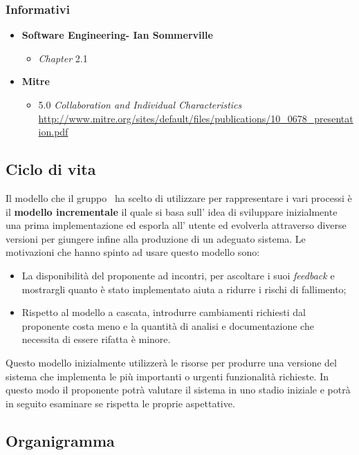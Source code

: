 \subsubsection{Informativi}
\begin{itemize}
\item \textbf{Software Engineering- Ian Sommerville}
	\begin{itemize}
	\item \textit{Chapter} 2.1
	\end{itemize}
\item \textbf{Mitre}
	\begin{itemize} 
	\item 5.0 \textit{Collaboration and Individual Characteristics} \url{http://www.mitre.org/sites/default/files/publications/10_0678_presentation.pdf}
	\end{itemize}
\end{itemize}
\subsection{Ciclo di vita}
\label{subsec:ciclodivita}
Il modello che il gruppo \gruppo ~ha scelto di utilizzare per rappresentare i vari processi è il \textbf{modello incrementale} il quale si basa sull' idea di sviluppare inizialmente una prima implementazione ed esporla all' utente ed evolverla attraverso diverse versioni per giungere infine alla produzione di un adeguato sistema. Le motivazioni che hanno spinto ad usare questo modello sono:
\begin{itemize}
	\item La disponibilità del proponente ad incontri, per ascoltare i suoi \textit{feedback} e mostrargli quanto è stato implementato aiuta a ridurre i rischi di fallimento;
	\item Rispetto al modello a cascata, introdurre cambiamenti richiesti dal proponente costa meno e la quantità di analisi e documentazione che necessita di essere rifatta è minore.
\end{itemize}
Questo modello inizialmente utilizzerà le risorse per produrre una versione del sistema che implementa le più importanti o urgenti funzionalità richieste. In questo modo il proponente potrà valutare il sistema in uno stadio iniziale e potrà in seguito esaminare se rispetta le proprie aspettative.

\subsection{Organigramma}
